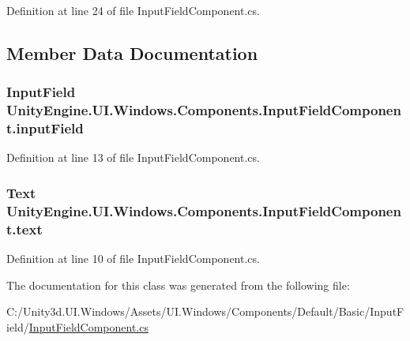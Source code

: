 Definition at line 24 of file Input\+Field\+Component.\+cs.



\subsection{Member Data Documentation}
\hypertarget{class_unity_engine_1_1_u_i_1_1_windows_1_1_components_1_1_input_field_component_a2fe0b48ff8d775415f47548faf33ed73}{}
\subsubsection[{input\+Field}]{\setlength{\rightskip}{0pt plus 5cm}Input\+Field Unity\+Engine.\+U\+I.\+Windows.\+Components.\+Input\+Field\+Component.\+input\+Field\hspace{0.3cm}{\ttfamily [protected]}}\label{class_unity_engine_1_1_u_i_1_1_windows_1_1_components_1_1_input_field_component_a2fe0b48ff8d775415f47548faf33ed73}


Definition at line 13 of file Input\+Field\+Component.\+cs.

\hypertarget{class_unity_engine_1_1_u_i_1_1_windows_1_1_components_1_1_input_field_component_a44ad94e89aa512f332900e24c91f23d4}{}
\subsubsection[{text}]{\setlength{\rightskip}{0pt plus 5cm}Text Unity\+Engine.\+U\+I.\+Windows.\+Components.\+Input\+Field\+Component.\+text\hspace{0.3cm}{\ttfamily [protected]}}\label{class_unity_engine_1_1_u_i_1_1_windows_1_1_components_1_1_input_field_component_a44ad94e89aa512f332900e24c91f23d4}


Definition at line 10 of file Input\+Field\+Component.\+cs.



The documentation for this class was generated from the following file\+:\begin{DoxyCompactItemize}
\item 
C\+:/\+Unity3d.\+U\+I.\+Windows/\+Assets/\+U\+I.\+Windows/\+Components/\+Default/\+Basic/\+Input\+Field/\hyperlink{_input_field_component_8cs}{Input\+Field\+Component.\+cs}\end{DoxyCompactItemize}
